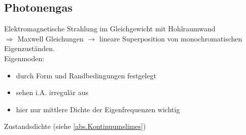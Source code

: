 \subsection{Photonengas}
\begin{figure}
\end{figure}
Elektromagnetische Strahlung im Gleichgewicht mit Hohlraumwand \\ $\Rightarrow$ Maxwell Gleichungen $\rightarrow$ lineare Superposition von monochromatischen Eigenzuständen. \\ Eigenmoden:
\begin{itemize}
    \item durch Form und Randbedingungen festgelegt
    \item sehen i.A. irregulär aus
    \item hier nur mittlere Dichte der Eigenfrequenzen wichtig
\end{itemize}
Zustandsdichte (siehe \cref{abs.Kontinuumslimes})
